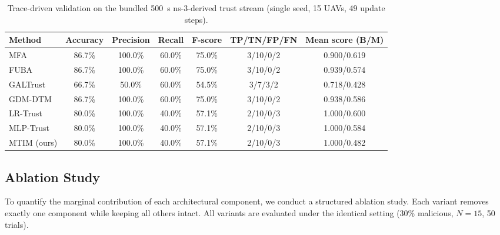 \documentclass[notspecified,article,submit,moreauthors]{Definitions/mdpi}
\begin{document}
\begin{table}[!htbp]
  \centering
  \caption{Trace-driven validation on the bundled 500~s ns-3-derived trust stream (single seed, 15 UAVs, 49 update steps).}
  \label{tab:ns3_trace_validation}
  \footnotesize
  \setlength{\tabcolsep}{6pt}
  \renewcommand{\arraystretch}{1.12}
  \begin{tabular}{l c c c c c c}
    \toprule
    Method & Accuracy & Precision & Recall & F-score & TP/TN/FP/FN & Mean score (B/M) \\
    \midrule
    MFA & 86.7\% & 100.0\% & 60.0\% & 75.0\% & 3/10/0/2 & 0.900/0.619 \\
    FUBA & 86.7\% & 100.0\% & 60.0\% & 75.0\% & 3/10/0/2 & 0.939/0.574 \\
    GALTrust & 66.7\% & 50.0\% & 60.0\% & 54.5\% & 3/7/3/2 & 0.718/0.428 \\
    GDM-DTM & 86.7\% & 100.0\% & 60.0\% & 75.0\% & 3/10/0/2 & 0.938/0.586 \\
    LR-Trust & 80.0\% & 100.0\% & 40.0\% & 57.1\% & 2/10/0/3 & 1.000/0.600 \\
    MLP-Trust & 80.0\% & 100.0\% & 40.0\% & 57.1\% & 2/10/0/3 & 1.000/0.584 \\
    MTIM (ours) & 80.0\% & 100.0\% & 40.0\% & 57.1\% & 2/10/0/3 & 1.000/0.482 \\
    \bottomrule
  \end{tabular}
\end{table}
\subsection{Ablation Study}
\label{sec:ablation}
To quantify the marginal contribution of each architectural component, we conduct a structured ablation study. Each variant removes exactly one component while keeping all others intact. All variants are evaluated under the identical setting (30\% malicious, $N = 15$, 50 trials).
\end{document}
